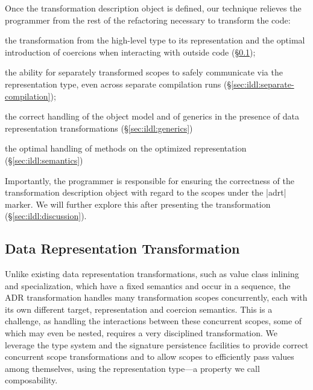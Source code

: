 Once the transformation description object is defined, our technique relieves the programmer from the rest of the refactoring necessary to transform the code:

\begin{compactitem}
\item the transformation from the high-level type to its representation and the optimal introduction of coercions when interacting with outside code (\S\ref{sec:ildl:ldl});
\item the ability for separately transformed scopes to safely communicate via the representation type, even across separate compilation runs (\S\ref{sec:ildl:separate-compilation});
\item the correct handling of the object model and of generics in the presence of data representation transformations (\S\ref{sec:ildl:generics})
\item the optimal handling of methods on the optimized representation (\S\ref{sec:ildl:semantics})
\end{compactitem}

Importantly, the programmer is responsible for ensuring the correctness of the transformation description object with regard to the scopes under the |adrt| marker. We will further explore this after presenting the transformation (\S\ref{sec:ildl:discussion}).












\subsection{Data Representation Transformation}
\label{sec:ildl:ldl}

Unlike existing data representation transformations, such as value class inlining and specialization, which have a fixed semantics and occur in a sequence, the ADR transformation handles many transformation scopes concurrently, each with its own different target, representation and coercion semantics. This is a challenge, as handling the interactions between these concurrent scopes, some of which may even be nested, requires a very disciplined transformation. We leverage the type system and the signature persistence facilities to provide correct concurrent scope transformations and to allow scopes to efficiently pass values among themselves, using the representation type---a property we call composability.

